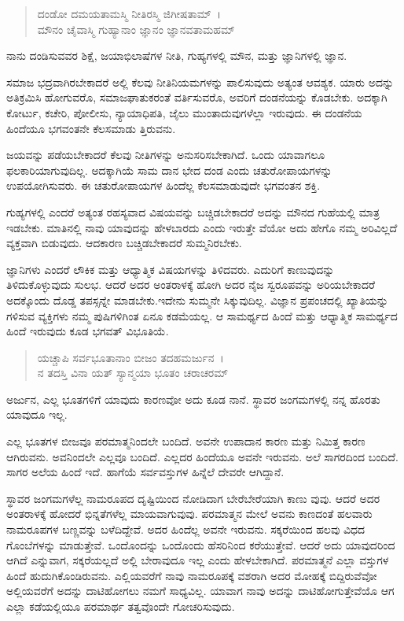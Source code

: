 \begin{verse}
ದಂಡೋ ದಮಯತಾಮಸ್ಮಿ ನೀತಿರಸ್ಮಿ ಜಿಗೀಷತಾಮ್~।\\ಮೌನಂ ಚೈವಾಸ್ಮಿ ಗುಹ್ಯಾನಾಂ ಜ್ಞಾನಂ ಜ್ಞಾನವತಾಮಹಮ್ 
\end{verse}

{\small ನಾನು ದಂಡಿಸುವವರ ಶಿಕ್ಷೆ, ಜಯಾಭಿಲಾಷೆಗಳ ನೀತಿ, ಗುಹ್ಯಗಳಲ್ಲಿ ಮೌನ, ಮತ್ತು ಜ್ಞಾನಿಗಳಲ್ಲಿ ಜ್ಞಾನ.}

ಸಮಾಜ ಭದ್ರವಾಗಿರಬೇಕಾದರೆ ಅಲ್ಲಿ ಕೆಲವು ನೀತಿನಿಯಮಗಳನ್ನು ಪಾಲಿಸುವುದು ಅತ್ಯಂತ ಆವಶ್ಯಕ. ಯಾರು ಅದನ್ನು ಅತಿಕ್ರಮಿಸಿ ಹೋಗುವರೊ, ಸಮಾಜಘಾತುಕರಂತೆ ವರ್ತಿಸುವರೊ, ಅವರಿಗೆ ದಂಡನೆಯನ್ನು ಕೊಡಬೇಕು. ಅದಕ್ಕಾಗಿ ಕೋರ್ಟು, ಕಚೇರಿ, ಪೋಲೀಸು, ನ್ಯಾಯಾಧಿಪತಿ, ಜೈಲು ಮುಂತಾದುವುಗಳೆಲ್ಲಾ ಇರುವುದು. ಈ ದಂಡನೆಯ ಹಿಂದೆಯೂ ಭಗವಂತನೇ ಕೆಲಸಮಾಡು ತ್ತಿರುವನು.

ಜಯವನ್ನು ಪಡೆಯಬೇಕಾದರೆ ಕೆಲವು ನೀತಿಗಳನ್ನು ಅನುಸರಿಸಬೇಕಾಗಿದೆ. ಒಂದು ಯಾವಾಗಲೂ ಫಲಕಾರಿಯಾಗುವುದಿಲ್ಲ. ಅದಕ್ಕಾಗಿಯೆ ಸಾಮ ದಾನ ಭೇದ ದಂಡ ಎಂದು ಚತುರೋಪಾಯಗಳನ್ನು ಉಪಯೋಗಿಸುವರು. ಈ ಚತುರೋಪಾಯಗಳ ಹಿಂದೆಲ್ಲ ಕೆಲಸಮಾಡುವುದೇ ಭಗವಂತನ ಶಕ್ತಿ.

ಗುಹ್ಯಗಳಲ್ಲಿ ಎಂದರೆ ಅತ್ಯಂತ ರಹಸ್ಯವಾದ ವಿಷಯವನ್ನು ಬಚ್ಚಿಡಬೇಕಾದರೆ ಅದನ್ನು ಮೌನದ ಗುಹೆಯಲ್ಲಿ ಮಾತ್ರ ಇಡಬೇಕು. ಮಾತಿನಲ್ಲಿ ನಾವು ಯಾವುದನ್ನು ಹೇಳಬಾರದು ಎಂದು ಇರುತ್ತೇ ವೆಯೋ ಅದು ಹೇಗೊ ನಮ್ಮ ಅರಿವಿಲ್ಲದೆ ವ್ಯಕ್ತವಾಗಿ ಬಿಡುವುದು. ಆದಕಾರಣ ಬಚ್ಚಿಡಬೇಕಾದರೆ ಸುಮ್ಮನಿರಬೇಕು.

ಜ್ಞಾನಿಗಳು ಎಂದರೆ ಲೌಕಿಕ ಮತ್ತು ಆಧ್ಯಾತ್ಮಿಕ ವಿಷಯಗಳನ್ನು ತಿಳಿದವರು. ಎದುರಿಗೆ ಕಾಣುವುದನ್ನು ತಿಳಿದುಕೊಳ್ಳುವುದು ಸುಲಭ. ಆದರೆ ಅದರ ಅಂತರಾಳಕ್ಕೆ ಹೋಗಿ ಅದರ ನೈಜ ಸ್ವರೂಪವನ್ನು ಅರಿಯಬೇಕಾದರೆ ಅದಕ್ಕೊಂದು ದೊಡ್ಡ ತಪಸ್ಸನ್ನೇ ಮಾಡಬೇಕು.ಇದೇನು ಸುಮ್ಮನೇ ಸಿಕ್ಕುವುದಿಲ್ಲ. ವಿಜ್ಞಾನ ಪ್ರಪಂಚದಲ್ಲಿ ಖ್ಯಾತಿಯನ್ನು ಗಳಿಸುವ ವ್ಯಕ್ತಿಗಳು ನಮ್ಮ ಪುಷಿಗಳಿಗಿಂತ ಏನೂ ಕಡಮೆಯಲ್ಲ. ಆ ಸಾಮರ್ಥ್ಯದ ಹಿಂದೆ ಮತ್ತು ಆಧ್ಯಾತ್ಮಿಕ ಸಾಮರ್ಥ್ಯದ ಹಿಂದೆ ಇರುವುದು ಕೂಡ ಭಗವತ್ ವಿಭೂತಿಯೆ.

\begin{verse}
ಯಚ್ಚಾಪಿ ಸರ್ವಭೂತಾನಾಂ ಬೀಜಂ ತದಹಮರ್ಜುನ~।\\ನ ತದಸ್ತಿ ವಿನಾ ಯತ್ ಸ್ಯಾನ್ಮಯಾ ಭೂತಂ ಚರಾಚರಮ್ 
\end{verse}

{\small ಅರ್ಜುನ, ಎಲ್ಲ ಭೂತಗಳಿಗೆ ಯಾವುದು ಕಾರಣವೋ ಅದು ಕೂಡ ನಾನೆ. ಸ್ಥಾವರ ಜಂಗಮಗಳಲ್ಲಿ ನನ್ನ ಹೊರತು ಯಾವುದೂ ಇಲ್ಲ.}

ಎಲ್ಲ ಭೂತಗಳ ಬೀಜವೂ ಪರಮಾತ್ಮನಿಂದಲೇ ಬಂದಿದೆ. ಅವನೇ ಉಪಾದಾನ ಕಾರಣ ಮತ್ತು ನಿಮಿತ್ತ ಕಾರಣ ಆಗಿರುವನು. ಅವನಿಂದಲೇ ಎಲ್ಲವೂ ಬಂದಿದೆ. ಎಲ್ಲದರ ಹಿಂದೆಯೂ ಅವನೇ ಇರುವನು. ಅಲೆ ಸಾಗರದಿಂದ ಬಂದಿದೆ. ಸಾಗರ ಅಲೆಯ ಹಿಂದೆ ಇದೆ. ಹಾಗೆಯೆ ಸರ್ವವಸ್ತುಗಳ ಹಿನ್ನೆಲೆ ದೇವರೇ ಆಗಿದ್ದಾನೆ.

ಸ್ಥಾವರ ಜಂಗಮಗಳೆಲ್ಲ ನಾಮರೂಪದ ದೃಷ್ಟಿಯಿಂದ ನೋಡಿದಾಗ ಬೇರೆಬೇರೆಯಾಗಿ ಕಾಣು ವುವು. ಆದರೆ ಅದರ ಅಂತರಾಳಕ್ಕೆ ಹೋದರೆ ಭಿನ್ನತೆಗಳೆಲ್ಲ ಮಾಯವಾಗುವುವು. ಪರಮಾತ್ಮನ ಮೇಲೆ ಅವನು ಕಾಣದಂತೆ ಹಲವಾರು ನಾಮರೂಪಗಳ ಬಣ್ಣವನ್ನು ಬಳೆದಿದ್ದೇವೆ. ಅದರ ಹಿಂದೆಲ್ಲ ಅವನೇ ಇರುವನು. ಸಕ್ಕರೆಯಿಂದ ಹಲವು ವಿಧದ ಗೊಂಬೆಗಳನ್ನು ಮಾಡುತ್ತೇವೆ. ಒಂದೊಂದನ್ನು ಒಂದೊಂದು ಹೆಸರಿನಿಂದ ಕರೆಯುತ್ತೇವೆ. ಆದರೆ ಅದು ಯಾವುದರಿಂದ ಆಗಿದೆ ಎನ್ನುವಾಗ, ಸಕ್ಕರೆಯಲ್ಲದೆ ಅಲ್ಲಿ ಬೇರಾವುದೂ ಇಲ್ಲ ಎಂದು ಹೇಳಬೇಕಾಗಿದೆ. ಪರಮಾತ್ಮನೆ ಎಲ್ಲಾ ವಸ್ತುಗಳ ಹಿಂದೆ ಹುದುಗಿಕೊಂಡಿರುವನು. ಎಲ್ಲಿಯವರೆಗೆ ನಾವು ನಾಮರೂಪಕ್ಕೆ ವಶರಾಗಿ ಅದರ ಮೋಹಕ್ಕೆ ಬಿದ್ದಿರುವೆವೋ ಅಲ್ಲಿಯವರೆಗೆ ಅದನ್ನು ದಾಟಿಹೋಗಲು ನಮಗೆ ಸಾಧ್ಯವಿಲ್ಲ. ಯಾವಾಗ ನಾವು ಅದನ್ನು ದಾಟಿಹೋಗುತ್ತೇವೆಯೊ ಆಗ ಎಲ್ಲಾ ಕಡೆಯಲ್ಲಿಯೂ ಪರಮಾರ್ಥ ತತ್ವವೊಂದೇ ಗೋಚರಿಸುವುದು.

